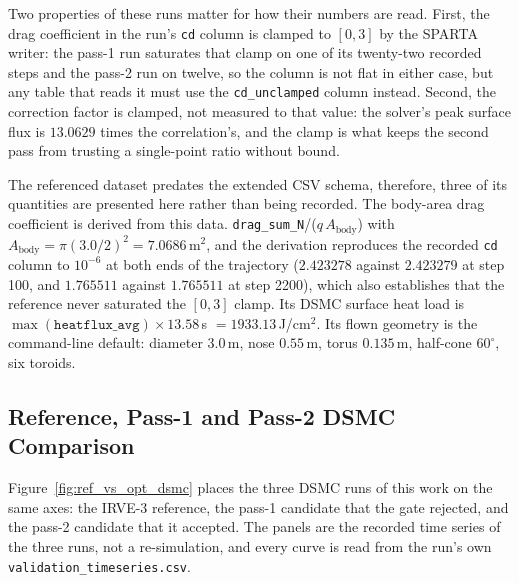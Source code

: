 Two properties of these runs matter for how their numbers are read. First, the drag coefficient in the run's \texttt{cd} column is clamped to $[0,3]$ by the SPARTA writer: the pass-1 run saturates that clamp on one of its twenty-two recorded steps and the pass-2 run on twelve, so the column is not flat in either case, but any table that reads it must use the \texttt{cd\_unclamped} column instead. Second, the correction factor is clamped, not measured to that value: the solver's peak surface flux is $13.0629$ times the correlation's, and the clamp is what keeps the second pass from trusting a single-point ratio without bound.

The referenced dataset predates the extended CSV schema, therefore, three of its quantities are presented here rather than being recorded. The body-area drag coefficient is derived from this data.
\texttt{drag\_sum\_N}/($q\,A_{\mathrm{body}}$) with $A_{\mathrm{body}} = \pi(3.0/2)^2 =
7.0686$\,m$^2$, and the derivation reproduces the recorded \texttt{cd} column to $10^{-6}$ at both ends of the trajectory ($2.423278$ against $2.423279$ at step 100, and $1.765511$ against $1.765511$ at step 2200), which also establishes that the reference never saturated the $[0,3]$ clamp. Its DSMC surface heat load is $\max(\texttt{heatflux\_avg})\times 13.58$\,s $= 1933.13$\,J/cm$^2$. Its flown geometry is the command-line default: diameter $3.0$\,m, nose $0.55$\,m, torus $0.135$\,m, half-cone $60^\circ$, six toroids.

\subsection{Reference, Pass-1 and Pass-2 DSMC Comparison}
Figure~\ref{fig:ref_vs_opt_dsmc} places the three DSMC runs of this work on the same axes: the IRVE-3 reference, the pass-1 candidate that the gate rejected, and the pass-2 candidate that it accepted. The panels are the recorded time series of the three runs, not a re-simulation, and every curve is read from the run's own \texttt{validation\_timeseries.csv}.

